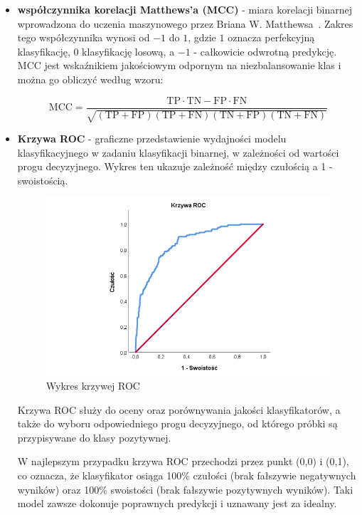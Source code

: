 \documentclass[a4paper,twoside,12pt]{book}
\begin{document}
\begin{itemize}
	\item \textbf{współczynnika korelacji Matthews'a (MCC)} - miara korelacji binarnej wprowadzona do uczenia maszynowego przez Briana W. Matthewsa~\cite{matthews1975}. Zakres tego współczynnika wynosi od $-1$ do $1$, gdzie $1$ oznacza perfekcyjną klasyfikację, $0$ klasyfikację losową, a $-1$ - całkowicie odwrotną predykcję. MCC jest wskaźnikiem jakościowym odpornym na niezbalansowanie klas i można go obliczyć według wzoru:

	      \begin{equation}
		      \text{MCC} = \frac{\text{TP} \cdot \text{TN} - \text{FP} \cdot \text{FN}}{\sqrt{(\text{TP} + \text{FP})(\text{TP} + \text{FN})(\text{TN} + \text{FP})(\text{TN} + \text{FN})}}
	      \end{equation}

	\item \textbf{Krzywa ROC} \cite{altman1994, brown2006roc, fawcett2006} - graficzne przedstawienie wydajności modelu klasyfikacyjnego w zadaniu klasyfikacji binarnej, w zależności od wartości progu decyzyjnego. Wykres ten ukazuje zależność między czułością a 1 - swoistością.

	      \begin{figure}[!h]
		      \centering
		      \includegraphics[width=1\textwidth]{img/r4/Krzywa_ROC.png}
		      \caption{Wykres krzywej ROC \cite{solecki2025roc}}
		      \label{fig:etykieta-rysunku}
	      \end{figure}

	      Krzywa ROC służy do oceny oraz porównywania jakości klasyfikatorów, a także do wyboru odpowiedniego progu decyzyjnego, od którego próbki są przypisywane do klasy pozytywnej.

	      W najlepszym przypadku krzywa ROC przechodzi przez punkt (0,0) i (0,1), co oznacza, że klasyfikator osiąga 100\% czułości (brak fałszywie negatywnych wyników) oraz 100\% swoistości (brak fałszywie pozytywnych wyników). Taki model zawsze dokonuje poprawnych predykcji i uznawany jest za idealny.


\end{itemize}
\end{document}
